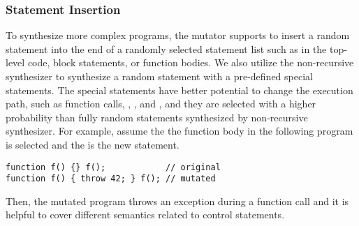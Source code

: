 \subsubsection{Statement Insertion}
To synthesize more complex programs, the mutator supports to insert a random
statement into the end of a randomly selected statement list such as in
the top-level code, block statements, or function bodies.  We also utilize the
non-recursive synthesizer to synthesize a random statement with a pre-defined
special statements.  The special statements have better potential to change the
execution path, such as function calls, , , and
, and they are selected with a higher probability than fully random
statements synthesized by non-recursive synthesizer.  For example, assume the
the function body in the following program is selected and the 
is the new statement.
\begin{lstlisting}[style=myJSstyle]
function f() {} f();            // original
function f() { throw 42; } f(); // mutated
\end{lstlisting}
Then, the mutated program throws an exception during a function call and it is
helpful to cover different semantics related to control statements.
